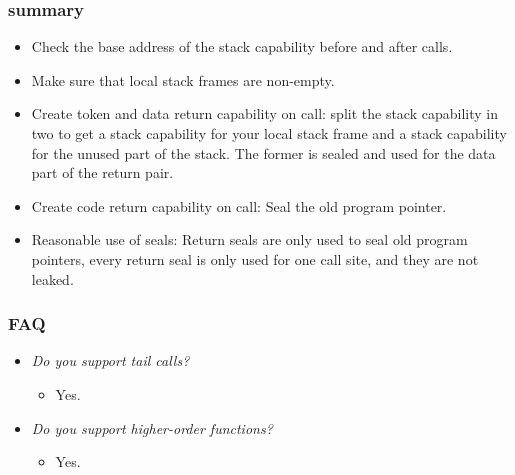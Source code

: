 \documentclass[aspectratio=169]{beamer}
\begin{document}
\begin{frame}
  \frametitle{\stktokens{} summary}
  \begin{itemize}
  \item Check the base address of the stack capability before and after calls.
  \item Make sure that local stack frames are non-empty.
  \item Create token and data return capability on call: split the stack
    capability in two to get a stack capability for your local stack frame and a
    stack capability for the unused part of the stack. The former is sealed and
    used for the data part of the return pair.
  \item Create code return capability on call: Seal the old program pointer.
  \item Reasonable use of seals: Return seals are only used to seal old program
    pointers, every return seal is only used for one call site, and they are not
    leaked. %
  \end{itemize}
\end{frame}

\begin{frame}
  \frametitle{\stktokens{} FAQ}
  \begin{itemize}
  \item \textit{Do you support tail calls?}
    \begin{itemize}
    \item Yes.
    \end{itemize}
  \item \textit{Do you support higher-order functions?}
    \begin{itemize}
    \item Yes.
    \end{itemize}
  \end{itemize}
\end{frame}
\end{document}
